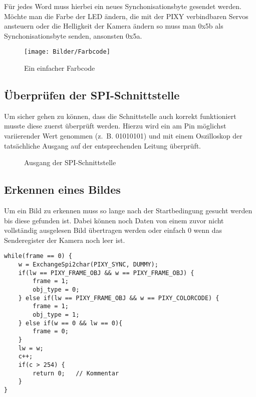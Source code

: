 Für jedes Word muss hierbei ein neues Synchonisationsbyte gesendet werden.\\
Möchte man die Farbe der LED ändern, die mit der PIXY verbindbaren Servos ansteuern oder die Helligkeit der Kamera ändern so muss man 0x5b als Synchonisationsbyte senden, ansonsten 0x5a.

\begin{figure}[H]
\begin{centering}
\texttt{[image: Bilder/Farbcode]}
\par\end{centering}
\caption{Ein einfacher Farbcode}
\label{Farbcode}
\end{figure}

\subsection{Überprüfen der SPI-Schnittstelle}
Um sicher gehen zu können, dass die Schnittstelle auch korrekt funktioniert musste diese zuerst überprüft werden. Hierzu wird ein am Pin möglichst variierender Wert genommen (z.~B. 01010101) und mit einem Oszilloskop der tatsächliche Ausgang auf der entsprechenden Leitung überprüft.
\begin{figure}[H]
  \begin{centering}
  \end{centering}
  \caption{Ausgang der SPI-Schnittstelle}
  \label{SPI-Ausgang}
\end{figure}

\subsection{Erkennen eines Bildes}
Um ein Bild zu erkennen muss so lange nach der Startbedingung gesucht werden bis diese gefunden ist. Dabei können noch Daten von einem zuvor nicht vollständig ausgelesen Bild übertragen werden oder einfach 0 wenn das Senderegister der Kamera noch leer ist.

\lstset{language = C}
\begin{lstlisting}
while(frame == 0) {
    w = ExchangeSpi2char(PIXY_SYNC, DUMMY);
    if(lw == PIXY_FRAME_OBJ && w == PIXY_FRAME_OBJ) {
        frame = 1;
        obj_type = 0;
    } else if(lw == PIXY_FRAME_OBJ && w == PIXY_COLORCODE) {
        frame = 1;
        obj_type = 1;
    } else if(w == 0 && lw == 0){
        frame = 0;
    }
    lw = w;
    c++;
    if(c > 254) {
        return 0;	// Kommentar
    }
}
\end{lstlisting}

